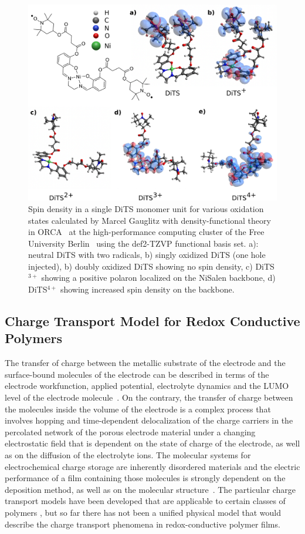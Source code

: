 \begin{figure}[h]
\center
	\includegraphics[width=1\textwidth]{./electrochemistry/figures/DFT_DITS.pdf}
	\caption{Spin density in a single DiTS monomer unit for various oxidation states calculated by Marcel Gauglitz with density-functional theory in ORCA~\cite{ORCA} at the high-performance computing cluster of the Free University Berlin~\cite{HPC_FUB} using the def2-TZVP functional basis set. a): neutral DiTS with two radicals, b) singly oxidized DiTS (one hole injected), b) doubly oxidized DiTS showing no spin density, c) DiTS$^{3+}$ showing a positive polaron localized on the NiSalen backbone, d) DiTS$^{4+}$ showing increased spin density on the backbone.}
	\label{fig:DiTS_DFT}
\end{figure}


\subsection{Charge Transport Model for Redox Conductive Polymers}  
The transfer of charge between the metallic substrate of the electrode and the surface-bound molecules of the electrode can be described in terms of the electrode workfunction, applied potential, electrolyte dynamics and the LUMO level of the electrode molecule~\cite{Bard_book}. 
On the contrary, the transfer of charge between the molecules inside the volume of the electrode is a complex process that involves hopping and time-dependent delocalization of the charge carriers in the percolated network of the porous electrode material under a changing electrostatic field that is dependent on the state of charge of the electrode, as well as on the diffusion of the electrolyte ions. The molecular systems for electrochemical charge storage are inherently disordered materials and the electric performance of a film containing those molecules is strongly dependent on the deposition method, as well as on the molecular structure~\cite{Xie2021}. The particular charge transport models have been developed that are applicable to certain classes of polymers , but so far there has not been a unified physical model that would describe the charge transport phenomena in redox-conductive polymer films.\\

